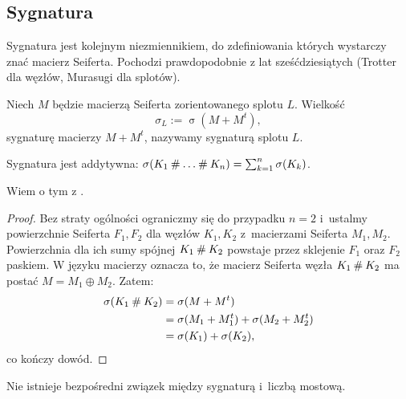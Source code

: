 
\subsection{Sygnatura}
%
Sygnatura jest kolejnym niezmiennikiem, do zdefiniowania których wystarczy znać macierz Seiferta.
Pochodzi prawdopodobnie z lat sześćdziesiątych (Trotter \cite{trotter62} dla węzłów, Murasugi \cite{murasugi65} dla splotów).
%
%

\begin{definition}[sygnatura]
\label{def:signature}%
    Niech $M$ będzie macierzą Seiferta zorientowanego splotu $L$.
    Wielkość
    \begin{equation}
        \sigma_L := \operatorname{\sigma} (M + M^t),
    \end{equation}
    sygnaturę macierzy $M + M^t$, nazywamy sygnaturą splotu $L$.
\end{definition}

\begin{proposition}
\label{prp:signature_additive}%
    Sygnatura jest addytywna: $\sigma(K_1 \mathbin{\#} \ldots \mathbin{\#} K_n) = \sum_{k=1}^n \sigma(K_k)$.
\end{proposition}

Wiem o tym z \cite[s. 127]{murasugi96}.

\begin{proof}
    Bez straty ogólności ograniczmy się do przypadku $n = 2$ i~ustalmy powierzchnie Seiferta $F_1, F_2$ dla węzłów $K_1, K_2$ z~macierzami Seiferta $M_1, M_2$.
    Powierzchnia dla ich sumy spójnej $K_1 \mathbin{\#} K_2$ powstaje przez sklejenie $F_1$ oraz $F_2$ paskiem.
    W języku macierzy oznacza to, że macierz Seiferta węzła $K_1 \mathbin{\#} K_2$ ma postać $M = M_1 \oplus M_2$.
    Zatem:
    \begin{align}
        \sigma(K_1 \mathbin{\#} K_2) & = \sigma(M + M^t) \\
                               & = \sigma(M_1 + M_1^t) + \sigma(M_2 + M_2^t) \\
                               & = \sigma(K_1) + \sigma(K_2),
    \end{align}
    co kończy dowód.
\end{proof}

\begin{corollary}
%
\label{no_relation_signature_bridge}%
    Nie istnieje bezpośredni związek między sygnaturą i~liczbą mostową.
\end{corollary}

